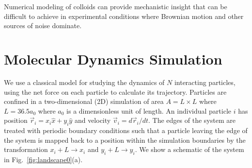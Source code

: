 \documentclass[twocolumn,preprintnumbers,amsmath,amssymb,aps,prx]{revtex4}
\begin{document}

Numerical modeling of colloids can provide mechanistic insight
that can be difficult to achieve in experimental conditions
where Brownian motion and other sources of noise dominate.




\section{Molecular Dynamics Simulation}
\label{sec:MD}

We use a classical model for 
studying the dynamics of $N$ interacting particles,
using the net force on each particle to calculate
its trajectory.
Particles are confined in a two-dimensional (2D) 
simulation of area $A = L \times L$ where $L=36.5 a_0$
where $a_0$ is a dimensionless unit of length.
An individual particle $i$ has
position $\vec{r}_i = x_i \hat{x} + y_i \hat{y}$
and velocity $\vec{v}_i = d\vec{r}_i/dt$.
The edges of the system are treated with
periodic boundary conditions
such that a particle leaving the edge of the system is mapped
back to a position within the simulation boundaries 
by the transformation $x_i+L \rightarrow x_i$ and $y_i+L \rightarrow y_i$.
We show a schematic of the system in Fig.~\ref{fig:landscape0}(a).
\end{document}
